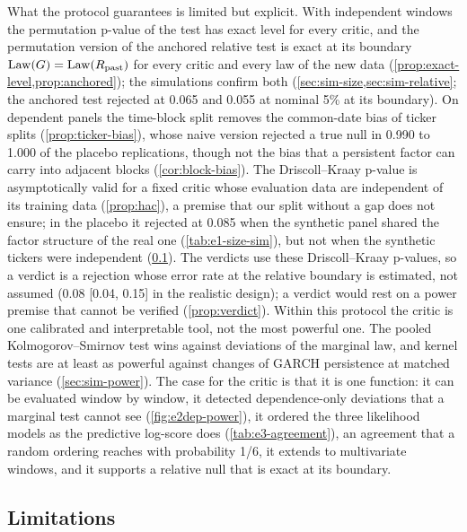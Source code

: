 What the protocol guarantees is limited but explicit. With independent windows the permutation
p-value of the \WC{} test has exact level for every critic, and the permutation version of the
anchored relative test is exact at its boundary $\operatorname{Law}(G)=\operatorname{Law}(R_{\mathrm{past}})$ for every critic and every
law of the new data (\cref{prop:exact-level,prop:anchored}); the simulations confirm both
(\cref{sec:sim-size,sec:sim-relative}; the anchored test rejected at 0.065 and 0.055 at nominal
5\% at its boundary). On dependent panels the time-block split removes the common-date bias of
ticker splits (\cref{prop:ticker-bias}), whose naive version rejected a true null in 0.990 to
1.000 of the placebo replications, though not the bias that a persistent factor can carry into
adjacent blocks (\cref{cor:block-bias}). The Driscoll--Kraay p-value is asymptotically valid for a fixed critic
whose evaluation data are independent of its training data (\cref{prop:hac}), a premise that our
split without a gap does not ensure; in the placebo it rejected at 0.085 when the synthetic panel
shared the factor structure of the real one (\cref{tab:e1-size-sim}), but not when the synthetic
tickers were independent (\cref{sec:concl-limitations}). The verdicts use these Driscoll--Kraay
p-values, so a \BAD{} verdict is a rejection whose error rate at the relative boundary is
estimated, not assumed (0.08 [0.04, 0.15] in the realistic design); a \GOOD{} verdict would rest
on a power premise that cannot be verified (\cref{prop:verdict}). Within this protocol the critic
is one calibrated and interpretable tool, not the most powerful one. The pooled
Kolmogorov--Smirnov test wins against deviations of the marginal law, and kernel tests are at
least as powerful against changes of GARCH persistence at matched variance
(\cref{sec:sim-power}). The case for the critic is that it is one function: it can be evaluated
window by window, it detected dependence-only deviations that a marginal test cannot see
(\cref{fig:e2dep-power}), it ordered the three likelihood models as the predictive log-score
does (\cref{tab:e3-agreement}), an agreement that a random ordering reaches with probability
1/6, it extends to multivariate windows, and it supports a relative null that is exact at its
boundary.

\subsection{Limitations}\label{sec:concl-limitations}

